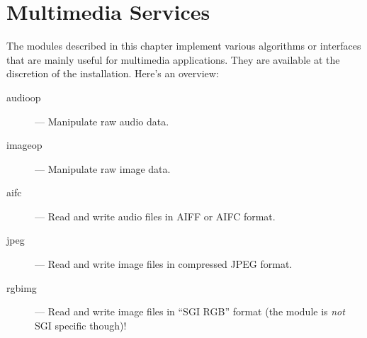 \chapter{Multimedia Services}

The modules described in this chapter implement various algorithms or
interfaces that are mainly useful for multimedia applications.  They
are available at the discretion of the installation.  Here's an overview:

\begin{description}

\item[audioop]
--- Manipulate raw audio data.

\item[imageop]
--- Manipulate raw image data.

\item[aifc]
--- Read and write audio files in AIFF or AIFC format.

\item[jpeg]
--- Read and write image files in compressed JPEG format.

\item[rgbimg]
--- Read and write image files in ``SGI RGB'' format (the module is
\emph{not} SGI specific though)!

\end{description}
